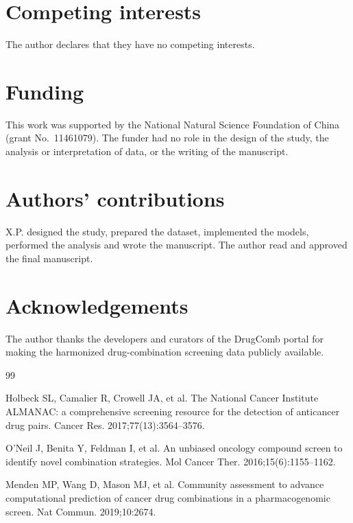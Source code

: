 \documentclass{bmcart}
\begin{document}
\begin{backmatter}
\section*{Competing interests}
The author declares that they have no competing interests.

\section*{Funding}
This work was supported by the National Natural Science Foundation of China (grant No.~11461079). The
funder had no role in the design of the study, the analysis or interpretation of data, or the writing
of the manuscript.

\section*{Authors' contributions}
X.P. designed the study, prepared the dataset, implemented the models, performed the analysis and wrote
the manuscript. The author read and approved the final manuscript.

\section*{Acknowledgements}
The author thanks the developers and curators of the DrugComb portal for making the harmonized
drug-combination screening data publicly available.

\begin{thebibliography}{99}

Holbeck SL, Camalier R, Crowell JA, et al.
The National Cancer Institute ALMANAC: a comprehensive screening resource for the detection of
anticancer drug pairs. Cancer Res. 2017;77(13):3564--3576.

O'Neil J, Benita Y, Feldman I, et al.
An unbiased oncology compound screen to identify novel combination strategies.
Mol Cancer Ther. 2016;15(6):1155--1162.

Menden MP, Wang D, Mason MJ, et al.
Community assessment to advance computational prediction of cancer drug combinations in a
pharmacogenomic screen. Nat Commun. 2019;10:2674.


\end{thebibliography}
\end{backmatter}
\end{document}
